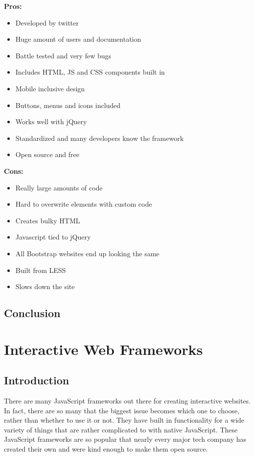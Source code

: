 \documentclass[draftclsnofoot,onecolumn,letterpaper,10pt,compsoc]{IEEEtran}
\begin{document}
    \textbf{Pros:}
    \begin{itemize}
      \item Developed by twitter
      \item Huge amount of users and documentation
      \item Battle tested and very few bugs
      \item Includes HTML, JS and CSS components built in
      \item Mobile inclusive design
      \item Buttons, menus and icons included
      \item Works well with jQuery
      \item Standardized and many developers know the framework
      \item Open source and free
    \end{itemize}

    \textbf{Cons:}
    \begin{itemize}
      \item Really large amounts of code
      \item Hard to overwrite elements with custom code
      \item Creates bulky HTML
      \item Javascript tied to jQuery
      \item All Bootstrap websites end up looking the same
      \item Built from LESS
      \item Slows down the site
    \end{itemize}

  \subsection{Conclusion}

\section{Interactive Web Frameworks}
  \subsection{Introduction}

  There are many JavaScript frameworks out there for creating interactive websites.
  In fact, there are so many that the biggest issue becomes which one to choose, rather than whether to use it or not.
  They have built in functionality for a wide variety of things that are rather complicated to with native JavaScript.
  These JavaScript frameworks are so popular that nearly every major tech company has created their own and were kind enough to make them open source.
\end{document}
